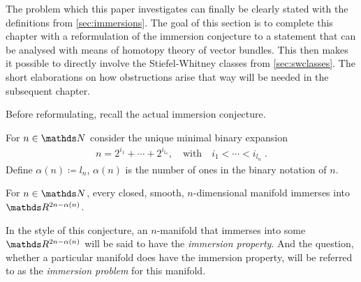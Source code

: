 The problem which this paper investigates can finally be clearly
stated with the definitions from
\autoref{sec:immersions}.
The goal of this section is to complete this chapter with a
reformulation of the immersion conjecture to a statement that can be
analysed with means of homotopy theory of vector bundles. This
then makes it possible to directly involve the Stiefel-Whitney classes
from \autoref{sec:swclasses}. The short elaborations on how
obstructions arise that way will be needed in the subsequent
chapter.

Before reformulating, recall the actual immersion conjecture.
\begin{Def}
  For $n\in\Nat$ consider the unique minimal binary expansion
  \begin{gather*}
    n=2^{i_1}+\dotsb+2^{i_{l_n}},
    \quad\text{with}\quad
    i_1<\dotsb<i_{l_n}
    \;.
  \end{gather*}
  Define $\alpha(n)\coloneqq l_n$, \idest $\alpha(n)$ is the number of
  ones in the binary notation of $n$.
\end{Def}
\begin{Thm}\label{thm:immersionconj}
  For $n\in\Nat$, every closed, smooth, $n$-dimensional manifold
  immerses into $\R^{2n-\alpha(n)}$.
\end{Thm}
In the style of this conjecture, an $n$-manifold that immerses into
some $\R^{2n-\alpha(n)}$ will be said to have the
\emph{immersion property}. %
And the question, whether a particular manifold does have the
immersion property, will be referred to as the \emph{immersion problem} for
this manifold.

